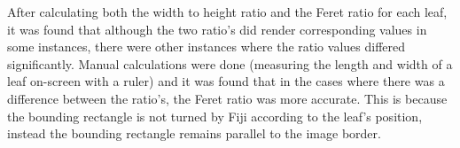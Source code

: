 \documentclass[paper=A4,bibliography=totocnumbered]{scrartcl}
\begin{document}
After calculating both the width to height ratio and the Feret ratio for each leaf, it was found that although the two ratio's did render corresponding values in some instances, there were other instances where the ratio values differed significantly. Manual calculations were done (measuring the length and width of a leaf on-screen with a ruler) and it was found that in the cases where there was a difference between the ratio's, the Feret ratio was more accurate. This is because the bounding rectangle is not turned by Fiji according to the leaf's position, instead the bounding rectangle remains parallel to the image border.



\renewcommand\bibname{References} %

\end{document}
